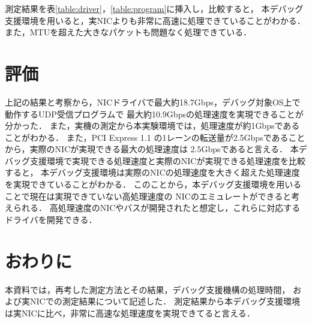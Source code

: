 \documentclass[12pt]{jsarticle}
\begin{document}
測定結果を表\ref{table:driver}，\ref{table:program}に挿入し，比較すると，
本デバッグ支援環境を用いると，実NICよりも非常に高速に処理できていることがわかる．
また，MTUを超えた大きなパケットも問題なく処理できている．

\section{評価}

上記の結果と考察から，NICドライバで最大約18.7Gbps，デバッグ対象OS上で動作するUDP受信プログラムで
最大約10.9Gbpsの処理速度を実現できることが分かった．
また，実機の測定から本実験環境では，処理速度が約1Gbpsであることがわかる．
また，PCI Express 1.1 の1レーンの転送量が2.5Gbpsであることから，実際のNICが実現できる最大の処理速度は
2.5Gbpsであると言える．
本デバッグ支援環境で実現できる処理速度と実際のNICが実現できる処理速度を比較すると，
本デバッグ支援環境は実際のNICの処理速度を大きく超えた処理速度を実現できていることがわかる．
このことから，本デバッグ支援環境を用いることで現在は実現できていない高処理速度の
NICのエミュレートができると考えられる．
高処理速度のNICやバスが開発されたと想定し，これらに対応するドライバを開発できる．

\section{おわりに}

本資料では，再考した測定方法とその結果，デバッグ支援機構の処理時間，
および実NICでの測定結果について記述した．
測定結果から本デバッグ支援環境は実NICに比べ，非常に高速な処理速度を実現できてると言える．
\end{document}
